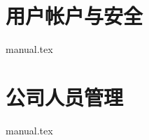 
%

\chapter{用户帐户与安全}
    \def\DIRNAME{../../../plover/modeling/plover-ox1/doc}
    {manual.tex}

\chapter{公司人员管理}
    \def\DIRNAME{../../../sem/base/sem-people/doc}
    {manual.tex}
